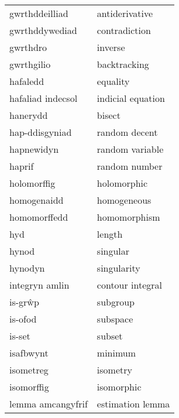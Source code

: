 \begin{supertabular}{p{0.22\textwidth}p{0.22\textwidth}}
                  gwrthddeilliad &                    antiderivative \\
                  gwrthddywediad &                     contradiction \\
                        gwrthdro &                           inverse \\
                      gwrthgilio &                      backtracking \\
                        hafaledd &                          equality \\
               hafaliad indecsol &                 indicial equation \\
                        hanerydd &                            bisect \\
                  hap-ddisgyniad &                     random decent \\
                      hapnewidyn &                   random variable \\
                          haprif &                     random number \\
                     holomorffig &                       holomorphic \\
                     homogenaidd &                       homogeneous \\
                    homomorffedd &                      homomorphism \\
                             hyd &                            length \\
                           hynod &                          singular \\
                         hynodyn &                       singularity \\
                  integryn amlin &                  contour integral \\
                         is-grŵp &                          subgroup \\
                         is-ofod &                          subspace \\
                          is-set &                            subset \\
                       isafbwynt &                           minimum \\
                       isometreg &                          isometry \\
                      isomorffig &                        isomorphic \\
               lemma amcangyfrif &                  estimation lemma \\

\end{supertabular}
